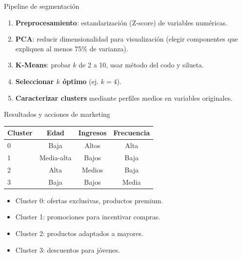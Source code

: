 \documentclass[aspectratio=169, 10pt, xcolor=table]{beamer}
\begin{document}
\begin{frame}{Pipeline de segmentación}
    \begin{enumerate}
        \item \textbf{Preprocesamiento}: estandarización (Z-score) de variables numéricas.
        \item \textbf{PCA}: reducir dimensionalidad para visualización (elegir componentes que expliquen al menos 75\% de varianza).
        \item \textbf{K-Means}: probar $k$ de 2 a 10, usar método del codo y silueta.
        \item \textbf{Seleccionar $k$ óptimo} (ej. $k=4$).
        \item \textbf{Caracterizar clusters} mediante perfiles medios en variables originales.
    \end{enumerate}
\end{frame}

\begin{frame}{Resultados y acciones de marketing}
    \begin{table}
        \centering
        \begin{tabular}{l|c|c|c}
            \toprule
            \textbf{Cluster} & \textbf{Edad} & \textbf{Ingresos} & \textbf{Frecuencia} \\
            \midrule
            0 & Baja & Altos & Alta \\
            1 & Media-alta & Bajos & Baja \\
            2 & Alta & Medios & Baja \\
            3 & Baja & Bajos & Media \\
            \bottomrule
        \end{tabular}
    \end{table}
    \begin{itemize}
        \item Cluster 0: ofertas exclusivas, productos premium.
        \item Cluster 1: promociones para incentivar compras.
        \item Cluster 2: productos adaptados a mayores.
        \item Cluster 3: descuentos para jóvenes.
    \end{itemize}
\end{frame}

\end{document}
